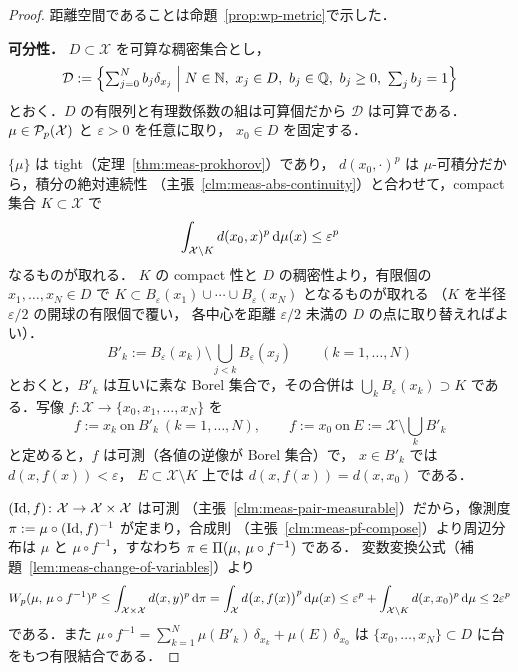 \begin{proof}
  距離空間であることは命題~\ref{prop:wp-metric}で示した．

  \textbf{可分性．}
  $D\subset\mathcal{X}$ を可算な稠密集合とし，
  \[
    \mathcal{D}
    :=\Bigl\{\textstyle\sum_{j=0}^Nb_j\delta_{x_j}
    \Bigm|N\in\mathbb{N},\ x_j\in D,\ b_j\in\mathbb{Q},\ b_j\geq0,\
    \textstyle\sum_jb_j=1\Bigr\}
  \]
  とおく．$D$ の有限列と有理数係数の組は可算個だから
  $\mathcal{D}$ は可算である．
  $\mu\in\mathcal{P}_{p}(\mathcal{X})$ と $\varepsilon>0$ を任意に取り，
  $x_0\in D$ を固定する．

  $\{\mu\}$ は tight（定理~\ref{thm:meas-prokhorov}）であり，
  $d(x_0,\cdot)^p$ は $\mu$-可積分だから，積分の絶対連続性
  （主張~\ref{clm:meas-abs-continuity}）と合わせて，compact 集合
  $K\subset\mathcal{X}$ で
  \[
    \int_{\mathcal{X}\setminus K}d(x_0,x)^p\,\mathrm{d}\mu(x)
    \leq\varepsilon^p
  \]
  なるものが取れる．
  $K$ の compact 性と $D$ の稠密性より，有限個の
  $x_1,\dots,x_N\in D$ で
  $K\subset B_\varepsilon(x_1)\cup\cdots\cup B_\varepsilon(x_N)$
  となるものが取れる
  （$K$ を半径 $\varepsilon/2$ の開球の有限個で覆い，
  各中心を距離 $\varepsilon/2$ 未満の $D$ の点に取り替えればよい）．
  \[
    B'_k:=B_\varepsilon(x_k)\setminus
    \bigcup_{j<k}B_\varepsilon(x_j)
    \qquad(k=1,\dots,N)
  \]
  とおくと，$B'_k$ は互いに素な Borel 集合で，その合併は
  $\bigcup_kB_\varepsilon(x_k)\supset K$ である．写像
  $f\colon\mathcal{X}\to\{x_0,x_1,\dots,x_N\}$ を
  \[
    f:=x_k\ \text{on}\ B'_k\ (k=1,\dots,N),
    \qquad
    f:=x_0\ \text{on}\
    E:=\mathcal{X}\setminus\textstyle\bigcup_kB'_k
  \]
  と定めると，$f$ は可測（各値の逆像が Borel 集合）で，
  $x\in B'_k$ では $d(x,f(x))<\varepsilon$，
  $E\subset\mathcal{X}\setminus K$ 上では $d(x,f(x))=d(x,x_0)$ である．

  $(\mathrm{Id},f)\colon\mathcal{X}\to\mathcal{X}\times\mathcal{X}$ は可測
  （主張~\ref{clm:meas-pair-measurable}）だから，像測度
  $\pi:=\mu\circ(\mathrm{Id},f)^{-1}$ が定まり，合成則
  （主張~\ref{clm:meas-pf-compose}）より周辺分布は
  $\mu$ と $\mu\circ f^{-1}$，すなわち
  $\pi\in\Pi(\mu,\,\mu\circ f^{-1})$ である．
  変数変換公式（補題~\ref{lem:meas-change-of-variables}）より
  \[
    W_p(\mu,\,\mu\circ f^{-1})^p
    \leq\int_{\mathcal{X}\times\mathcal{X}}d(x,y)^p\,\mathrm{d}\pi
    =\int_{\mathcal{X}}d\bigl(x,f(x)\bigr)^p\,\mathrm{d}\mu(x)
    \leq\varepsilon^p
    +\int_{\mathcal{X}\setminus K}d(x,x_0)^p\,\mathrm{d}\mu
    \leq2\varepsilon^p
  \]
  である．また
  $\mu\circ f^{-1}
  =\sum_{k=1}^N\mu(B'_k)\,\delta_{x_k}+\mu(E)\,\delta_{x_0}$
  は $\{x_0,\dots,x_N\}\subset D$ に台をもつ有限結合である．


\end{proof}
